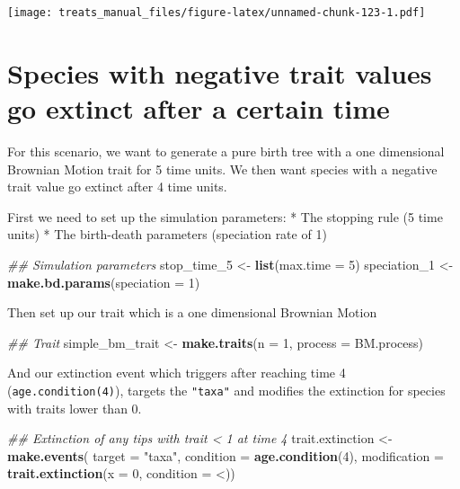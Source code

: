 \documentclass[
]{book}
\newenvironment{Shaded}{\begin{snugshade}}{\end{snugshade}}
\newcommand{\CommentTok}[1]{\textcolor[rgb]{0.56,0.35,0.01}{\textit{#1}}}
\newcommand{\DataTypeTok}[1]{\textcolor[rgb]{0.13,0.29,0.53}{#1}}
\newcommand{\DecValTok}[1]{\textcolor[rgb]{0.00,0.00,0.81}{#1}}
\newcommand{\KeywordTok}[1]{\textcolor[rgb]{0.13,0.29,0.53}{\textbf{#1}}}
\newcommand{\NormalTok}[1]{#1}
\newcommand{\StringTok}[1]{\textcolor[rgb]{0.31,0.60,0.02}{#1}}
\begin{document}
\texttt{[image: treats\_manual\_files/figure-latex/unnamed-chunk-123-1.pdf]}

\hypertarget{EGneg_ext}{%
\section{Species with negative trait values go extinct after a certain time}\label{EGneg_ext}}

For this scenario, we want to generate a pure birth tree with a one dimensional Brownian Motion trait for 5 time units.
We then want species with a negative trait value go extinct after 4 time units.

First we need to set up the simulation parameters:
* The stopping rule (5 time units)
* The birth-death parameters (speciation rate of 1)

\begin{Shaded}
\begin{Highlighting}[]
\CommentTok{\#\# Simulation parameters}
\NormalTok{stop\_time\_}\DecValTok{5}\NormalTok{ \textless{}{-}}\StringTok{ }\KeywordTok{list}\NormalTok{(}\DataTypeTok{max.time =} \DecValTok{5}\NormalTok{)}
\NormalTok{speciation\_}\DecValTok{1}\NormalTok{ \textless{}{-}}\StringTok{ }\KeywordTok{make.bd.params}\NormalTok{(}\DataTypeTok{speciation =} \DecValTok{1}\NormalTok{)}
\end{Highlighting}
\end{Shaded}

Then set up our trait which is a one dimensional Brownian Motion

\begin{Shaded}
\begin{Highlighting}[]
\CommentTok{\#\# Trait}
\NormalTok{simple\_bm\_trait \textless{}{-}}\StringTok{ }\KeywordTok{make.traits}\NormalTok{(}\DataTypeTok{n =} \DecValTok{1}\NormalTok{, }\DataTypeTok{process =}\NormalTok{ BM.process)}
\end{Highlighting}
\end{Shaded}

And our extinction event which triggers after reaching time 4 (\texttt{age.condition(4)}), targets the \texttt{"taxa"} and modifies the extinction for species with traits lower than 0.

\begin{Shaded}
\begin{Highlighting}[]
\CommentTok{\#\# Extinction of any tips with trait \textless{} 1 at time 4}
\NormalTok{trait.extinction \textless{}{-}}\StringTok{ }\KeywordTok{make.events}\NormalTok{(}
                      \DataTypeTok{target =} \StringTok{"taxa"}\NormalTok{,}
                      \DataTypeTok{condition =} \KeywordTok{age.condition}\NormalTok{(}\DecValTok{4}\NormalTok{),}
                      \DataTypeTok{modification =} \KeywordTok{trait.extinction}\NormalTok{(}\DataTypeTok{x =} \DecValTok{0}\NormalTok{,}
                                                      \DataTypeTok{condition =} \StringTok{\textasciigrave{}}\DataTypeTok{\textless{}}\StringTok{\textasciigrave{}}\NormalTok{))}
\end{Highlighting}
\end{Shaded}
\end{document}
